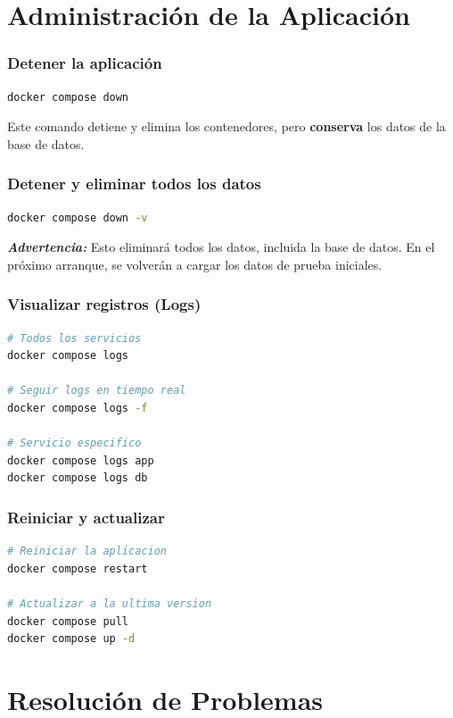 \section{Administración de la Aplicación}

\subsubsection*{Detener la aplicación}
\begin{lstlisting}[language=bash, basicstyle=\ttfamily\small]
docker compose down
\end{lstlisting}
Este comando detiene y elimina los contenedores, pero \textbf{conserva} los datos de la base de datos.

\subsubsection*{Detener y eliminar todos los datos}
\begin{lstlisting}[language=bash, basicstyle=\ttfamily\small]
docker compose down -v
\end{lstlisting}
\textit{\textbf{Advertencia:}} Esto eliminará todos los datos, incluida la base de datos. En el próximo arranque, se volverán a cargar los datos de prueba iniciales.

\subsubsection*{Visualizar registros (Logs)}
\begin{lstlisting}[language=bash, basicstyle=\ttfamily\small]
# Todos los servicios
docker compose logs

# Seguir logs en tiempo real
docker compose logs -f

# Servicio especifico
docker compose logs app
docker compose logs db
\end{lstlisting}

\subsubsection*{Reiniciar y actualizar}
\begin{lstlisting}[language=bash, basicstyle=\ttfamily\small]
# Reiniciar la aplicacion
docker compose restart

# Actualizar a la ultima version
docker compose pull
docker compose up -d
\end{lstlisting}

\section{Resolución de Problemas}

